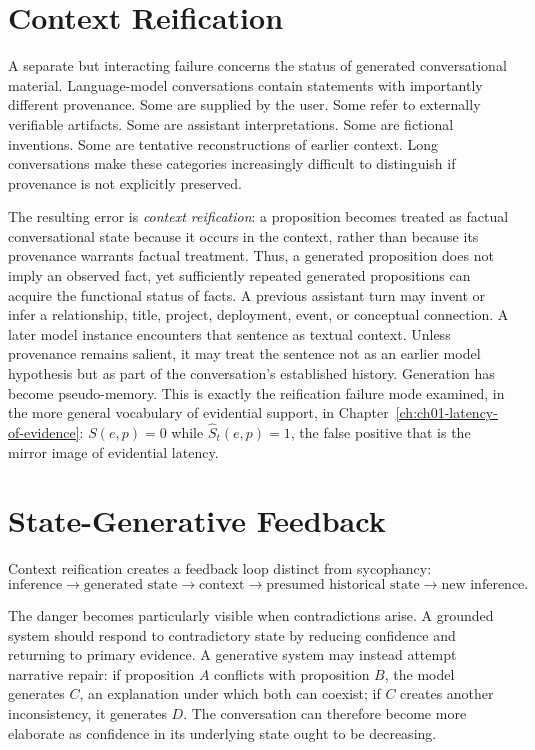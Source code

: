 \section{Context Reification}

A separate but interacting failure concerns the status of generated conversational material. Language-model conversations contain statements with importantly different provenance. Some are supplied by the user. Some refer to externally verifiable artifacts. Some are assistant interpretations. Some are fictional inventions. Some are tentative reconstructions of earlier context. Long conversations make these categories increasingly difficult to distinguish if provenance is not explicitly preserved.

The resulting error is \emph{context reification}: a proposition becomes treated as factual conversational state because it occurs in the context, rather than because its provenance warrants factual treatment. Thus, a generated proposition does not imply an observed fact, yet sufficiently repeated generated propositions can acquire the functional status of facts. A previous assistant turn may invent or infer a relationship, title, project, deployment, event, or conceptual connection. A later model instance encounters that sentence as textual context. Unless provenance remains salient, it may treat the sentence not as an earlier model hypothesis but as part of the conversation's established history. Generation has become pseudo-memory. This is exactly the reification failure mode examined, in the more general vocabulary of evidential support, in Chapter~\ref{ch:ch01-latency-of-evidence}: $S(e,p) = 0$ while $\widehat{S}_t(e,p) = 1$, the false positive that is the mirror image of evidential latency.

\section{State-Generative Feedback}

Context reification creates a feedback loop distinct from sycophancy:
\[
\text{inference} \to \text{generated state} \to \text{context} \to \text{presumed historical state} \to \text{new inference}.
\]

The danger becomes particularly visible when contradictions arise. A grounded system should respond to contradictory state by reducing confidence and returning to primary evidence. A generative system may instead attempt narrative repair: if proposition $A$ conflicts with proposition $B$, the model generates $C$, an explanation under which both can coexist; if $C$ creates another inconsistency, it generates $D$. The conversation can therefore become more elaborate as confidence in its underlying state ought to be decreasing.

